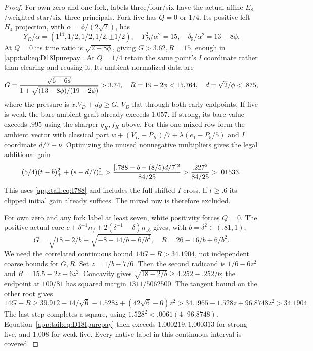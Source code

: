 \documentclass[11pt]{article}
\theoremstyle{definition}
\theoremstyle{remark}
\begin{document}
\begin{proof}
For own zero and one fork, labels three/four/six have the
actual affine $E_8$/weighted-star/six--three principals.
Fork five has $Q=0$ or $1/4$. Its positive left $H_4$
projection, with $\alpha=\phi/(2\sqrt2)$, has
\[
 Y_D/\alpha=(1^{14},1/2,1/2,1/2,\pm1/2),\quad
 Y_D^2/\alpha^2=15,\quad \delta_5/\alpha^2=13-8\phi.
\]
At $Q=0$ its time ratio is $\sqrt{2+8\phi}$, giving
$G>3.62,R=15$, enough in \eqref{app:tail:eq:D18Ipurepay}.
At $Q=1/4$ retain the same point's $I$ coordinate rather
than clearing and reusing it. Its ambient normalized data are
\[
 G={\sqrt{6+6\phi}\over1+\sqrt{(13-8\phi)/(19-2\phi)}}>3.74,
 \quad R=19-2\phi<15.764,\quad d=\sqrt2/\phi<.875,
\]
where the pressure is $x.V_D+d y\ge G$, $V_D$ flat through
both early endpoints. If five is weak the bare ambient graft
already exceeds $1.057$. If strong, its bare value exceeds
$.995$ using the sharper $q_K,f_K$ above.
For this one mixed row form the ambient vector with classical
part $w+(V_D-P_K)/7+\lambda(e_1-P_5/5)$ and $I$ coordinate
$d/7+\nu$. Optimizing the unused nonnegative multipliers
gives the legal additional gain
\[
 (5/4)(t-b)_+^2+(s-d/7)_+^2
 >{[.788-b-(8/5)d/7]^2\over84/25}
 >{.227^2\over84/25}>.01533.
\]
This uses \eqref{app:tail:eq:I788} and includes the full
shifted $I$ cross. If $t\ge.6$ its clipped initial gain
already suffices. The mixed row is therefore excluded.

For own zero and any fork label at least seven, white
positivity forces $Q=0$. The positive actual core
$c+\delta^{-1}n_f+2(\delta^{-1}-\delta)n_{16}$ gives,
with $b=\delta^2\in(.81,1)$,
\[
 G=\sqrt{18-2/b}-\sqrt{-8+14/b-6/b^2},\quad
 R=26-16/b+6/b^2.
\]
We need the correlated continuous bound $14G-R>34.1904$,
not independent coarse bounds for $G,R$.
Set $z=1/b-7/6$. Then the second radicand is
$1/6-6z^2$ and $R=15.5-2z+6z^2$.
Concavity gives $\sqrt{18-2/b}\ge4.252-.252/b$;
the endpoint at $100/81$ has squared margin $1311/5062500$.
The tangent bound on the other root gives
\[
14G-R\ge39.912-14/\sqrt6-1.528z+(42\sqrt6-6)z^2
>34.1965-1.528z+96.8748z^2>34.1904.
\]
The last step completes a square, using
$1.528^2<.0061(4\cdot96.8748)$.
Equation~\eqref{app:tail:eq:D18Ipurepay} then exceeds
$1.000219,1.000313$ for strong five, and $1.008$ for weak
five. Every native label in this continuous interval is covered.


\end{proof}
\end{document}
